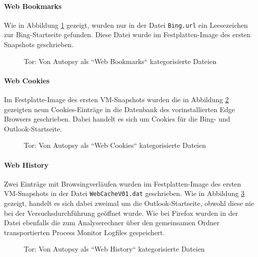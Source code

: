 \begin{appendices}
\paragraph*{Web Bookmarks}
Wie in Abbildung \ref{img:tor-web-bookmarks} gezeigt, wurden nur in der Datei \texttt{Bing.url} ein Leesezeichen zur Bing-Startseite gefunden. Diese Datei wurde im Festplatten-Image des ersten Snapshots geschrieben.
\begin{figure}[h!]
	\centerline{} 
	\caption{Tor: Von Autopsy als ``Web Bookmarks`` kategorisierte Dateien}
	\label{img:tor-web-bookmarks} 
\end{figure}

\paragraph*{Web Cookies}
Im Festplatte-Image des ersten VM-Snapshots wurden die in Abbildung \ref{img:tor-web-cookies} gezeigten neun Cookies-Einträge in die Datenbank des vorinstallierten Edge Browsers geschrieben. Dabei handelt es sich um Cookies für die Bing- und Outlook-Startseite.
\begin{figure}[h!]
	\centerline{} 
	\caption{Tor: Von Autopsy als ``Web Cookies`` kategorisierte Dateien}
	\label{img:tor-web-cookies} 
\end{figure}

\paragraph*{Web History}
Zwei Einträge mit Browsingverläufen wurden im Festplatten-Image des ersten VM-Snapshots in der Datei \texttt{WebCacheV01.dat} geschrieben. Wie in Abbildung \ref{img:tor-web-history} gezeigt, handelt es sich dabei zweimal um die Outlook-Startseite, obwohl diese nie bei der Versuchsdurchführung geöffnet wurde. Wie bei Firefox wurden in der Datei ebenfalls die zum Analyserechner über den gemeinsamen Ordner transportierten Process Monitor Logfiles gespeichert.
\begin{figure}[h!]
	\centerline{}
	\caption{Tor: Von Autopsy als ``Web History`` kategorisierte Dateien}
	\label{img:tor-web-history}  
\end{figure}


\end{appendices}
